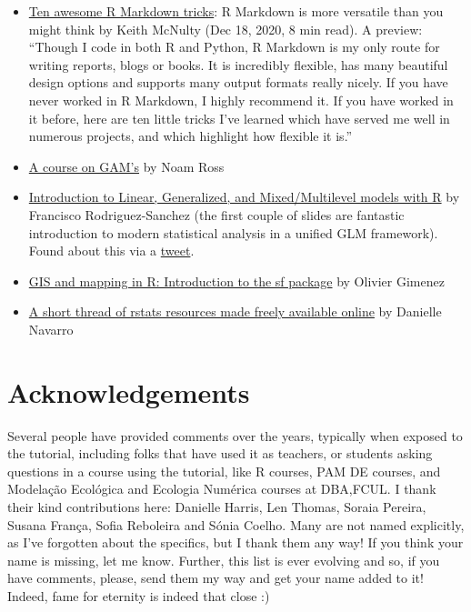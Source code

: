 \documentclass[
]{article}
\begin{document}
\begin{itemize}
\item
  \href{https://towardsdatascience.com/ten-awesome-r-markdown-tricks-56ef6d41098}{Ten
  awesome R Markdown tricks}: R Markdown is more versatile than you
  might think by Keith McNulty (Dec 18, 2020, 8 min read). A preview:
  ``Though I code in both R and Python, R Markdown is my only route for
  writing reports, blogs or books. It is incredibly flexible, has many
  beautiful design options and supports many output formats really
  nicely. If you have never worked in R Markdown, I highly recommend it.
  If you have worked in it before, here are ten little tricks I've
  learned which have served me well in numerous projects, and which
  highlight how flexible it is.''
\item
  \href{https://noamross.github.io/gams-in-r-course/}{A course on GAM's}
  by Noam Ross
\item
  \href{https://github.com/Pakillo/LM-GLM-GLMM-intro/blob/trees/README.md}{Introduction
  to Linear, Generalized, and Mixed/Multilevel models with R} by
  Francisco Rodriguez-Sanchez (the first couple of slides are fantastic
  introduction to modern statistical analysis in a unified GLM
  framework). Found about this via a
  \href{https://twitter.com/frod_san/status/1349321844483043335}{tweet}.
\item
  \href{https://oliviergimenez.github.io/intro_spatialR/}{GIS and
  mapping in R: Introduction to the sf package} by Olivier Gimenez
\item
  \href{https://twitter.com/djnavarro/status/1278470778879569920?s=09}{A
  short thread of rstats resources made freely available online} by
  Danielle Navarro
\end{itemize}

\hypertarget{acknowledgements}{%
\section{Acknowledgements}\label{acknowledgements}}

Several people have provided comments over the years, typically when
exposed to the tutorial, including folks that have used it as teachers,
or students asking questions in a course using the tutorial, like R
courses, PAM DE courses, and Modelação Ecológica and Ecologia Numérica
courses at DBA,FCUL. I thank their kind contributions here: Danielle
Harris, Len Thomas, Soraia Pereira, Susana França, Sofia Reboleira and
Sónia Coelho. Many are not named explicitly, as I've forgotten about the
specifics, but I thank them any way! If you think your name is missing,
let me know. Further, this list is ever evolving and so, if you have
comments, please, send them my way and get your name added to it!
Indeed, fame for eternity is indeed that close :)
\end{document}
